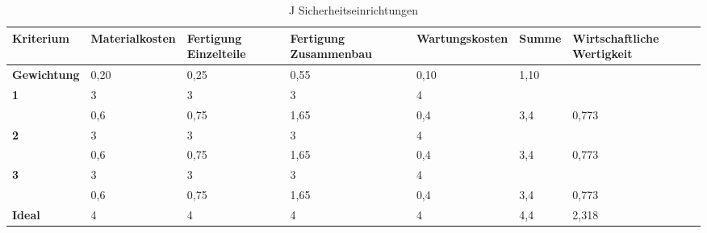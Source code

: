\documentclass[10pt,a4paper]{article}
\begin{document}
\begin{table}[h!]
    \centering
    \hspace*{0in} %
    \begin{tabular}{>{\bfseries}p{2cm} p{2.2cm} p{2cm} p{2cm} p{2.5cm} p{2cm} p{2cm}}
        \toprule
        Kriterium  & Materialkosten & Fertigung Einzelteile & Fertigung Zusammenbau & Wartungskosten & Summe & Wirtschaftliche Wertigkeit \\
        \midrule
        Gewichtung & 0,20           & 0,25                  & 0,55                  & 0,10           & 1,10  &                            \\
        \midrule
        1          & 3              & 3                     & 3                     & 4              &       &                            \\
                   & 0,6            & 0,75                  & 1,65                  & 0,4            & 3,4   & 0,773                      \\
        \midrule
        2          & 3              & 3                     & 3                     & 4              &       &                            \\
                   & 0,6            & 0,75                  & 1,65                  & 0,4            & 3,4   & 0,773                      \\
        \midrule
        3          & 3              & 3                     & 3                     & 4              &       &                            \\
                   & 0,6            & 0,75                  & 1,65                  & 0,4            & 3,4   & 0,773                      \\
        \midrule
        Ideal      & 4              & 4                     & 4                     & 4              & 4,4   & 2,318                      \\
        \bottomrule
    \end{tabular}
    \caption{J Sicherheitseinrichtungen}
\end{table}
\end{document}
